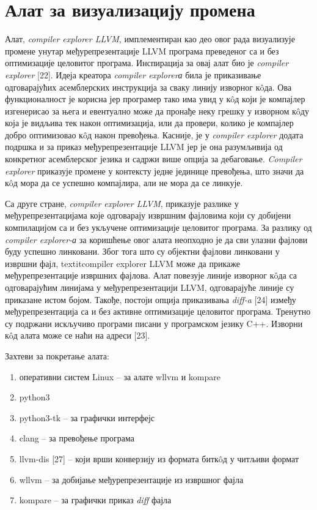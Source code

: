 \documentclass[12pt,oneside]{memoir}
\begin{document}
\chapter{Алат за визуализацију промена}

Алат, \textit{compiler explorer LLVM}, имплементиран као део овог рада визуализује
промене унутар међурепрезентације LLVM програма 
преведеног са и без оптимизације целовитог програма.
Инспирација за овај алат био је \textit{compiler explorer} [22].
Идеја креатора \textit{compiler explorerа} била је приказивање одговарајућих асемблерских
инструкција за сваку линију изворног к\^{o}да.
Ова функционалност је корисна јер програмер тако има увид у к\^{o}д који је 
компајлер изгенерисао за њега и евентуално може да пронађе неку грешку у 
изворном к\^{o}ду која је видљива тек након оптимизација, или да провери, колико је компајлер добро оптимизовао к\^{o}д након превођења.
Касније, је у \textit{compiler explorer} додата подршка и за приказ међурепрезентације LLVM 
јер је она разумљивија од конкретног асемблерског језика и садржи више опција
за дебаговање.
\textit{Compiler explorer} приказује промене у контексту једне јединице превођења,
 што значи да к\^{o}д мора да се успешно компајлира, али не мора да се линкује. 
 
Са друге стране, \textit{compiler explorer LLVM}, 
приказује разлике у међурепрезентацијама које одговарају извршним фајловима који су
добијени компилацијом 
са и без укључене оптимизације целовитог програма.
За разлику од \textit{compiler explorer-а} за коришћење овог алата неопходно је да сви
улазни фајлови буду успешно линковани.
Због тога што су објектни фајлови линковани у извршни фајл, textit{compiler explorer LLVM} може да прикаже 
међурепрезентације извршних фајлова.
Алат повезује линије изворног к\^{o}да са одговарајућим линијама у међурепрезентацији LLVM, одговарајуће линије су приказане истом бојом.
Такође, постоји опција приказивања \textit{diff-a} [24] између међурепрезентација са и без
активне оптимизације целовитог програма.
Тренутно су подржани искључиво програми писани у програмском језику C++.
Изворни  к\^{o}д алата може се наћи на адреси [23].

Захтеви за покретање алата:
\begin{enumerate}
\item оперативни систем Linux -- за алате wllvm и kompare
\item python3
\item python3-tk -- за графички интерфејс
\item clang -- за превођење програма
\item llvm-dis [27] --  који врши конверзију из формата битк\^{o}д у
			читљиви формат
\item wllvm -- за добијање међурепрезентације из извршног фајла
\item kompare -- за графички приказ \textit{diff} фајла
\end{enumerate}
\end{document}
